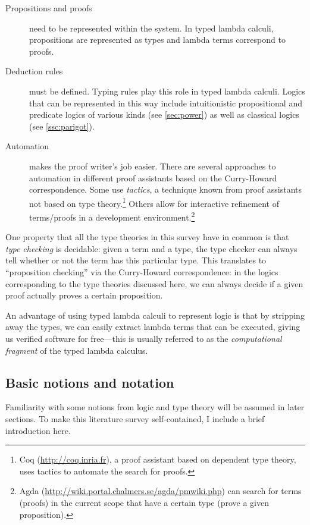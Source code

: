 \documentclass[12pt,toc=bibliography,numbers=noendperiod,
               footnotes=multiple,twoside]{scrartcl}
\begin{document}
\begin{description}
\item[Propositions and proofs] need to be represented within the system. In typed lambda calculi, propositions are represented as types and lambda terms correspond to proofs.
\item[Deduction rules] must be defined. Typing rules play this role in typed lambda calculi. Logics that can be represented in this way include intuitionistic propositional and predicate logics of various kinds (see \cref{sec:power}) as well as classical logics (see \cref{ssc:parigot}).
\item[Automation] makes the proof writer's job easier. There are several approaches to automation in different proof assistants based on the Curry-Howard correspondence. Some use \emph{tactics}, a technique known from proof assistants not based on type theory.\footnote{Coq (\url{http://coq.inria.fr}), a proof assistant based on dependent type theory, uses tactics to automate the search for proofs.} Others allow for interactive refinement of terms/proofs in a development environment.\footnote{Agda (\url{http://wiki.portal.chalmers.se/agda/pmwiki.php}) can search for terms (proofs) in the current scope that have a certain type (prove a given proposition).}
\end{description}

One property that all the type theories in this survey have in common is that \emph{type checking} is decidable: given a term and a type, the type checker can always tell whether or not the term has this particular type. This translates to \enquote{proposition checking} via the Curry-Howard correspondence: in the logics corresponding to the type theories discussed here, we can always decide if a given proof actually proves a certain proposition.

An advantage of using typed lambda calculi to represent logic is that by stripping away the types, we can easily extract lambda terms that can be executed, giving us verified software for free---this is usually referred to as the \emph{computational fragment} of the typed lambda calculus.

\subsection{Basic notions and notation}

Familiarity with some notions from logic and type theory will be assumed in later sections. To make this literature survey self-contained, I include a brief introduction here.
\end{document}
